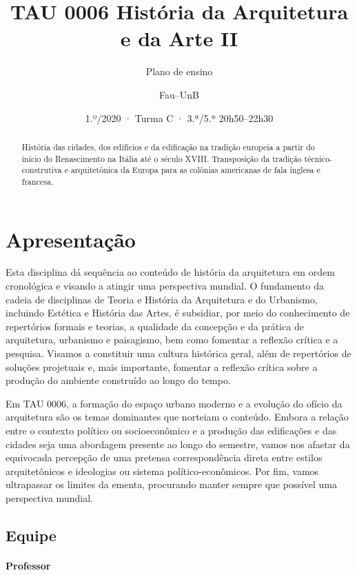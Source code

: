 \documentclass[
  11pt,
  brazil,
  a4paper,
]{article}
\title{TAU 0006 História da Arquitetura e da Arte II}
\subtitle{Plano de ensino}
\author{Fau--UnB}
\date{1.º/2020 · Turma C · 3.ª/5.ª 20h50--22h30}
\begin{document}
\maketitle
\begin{abstract}
História das cidades, dos edifícios e da edificação na tradição europeia
a partir do início do Renascimento na Itália até o século XVIII.
Transposição da tradição técnico-construtiva e arquitetônica da Europa
para as colônias americanas de fala inglesa e francesa.
\end{abstract}

\hypertarget{apresentauxe7uxe3o}{%
\section{Apresentação}\label{apresentauxe7uxe3o}}

Esta disciplina dá sequência ao conteúdo de história da arquitetura em
ordem cronológica e visando a atingir uma perspectiva mundial. O
fundamento da cadeia de disciplinas de Teoria e História da Arquitetura
e do Urbanismo, incluindo Estética e História das Artes, é subsidiar,
por meio do conhecimento de repertórios formais e teorias, a qualidade
da concepção e da prática de arquitetura, urbanismo e paisagismo, bem
como fomentar a reflexão crítica e a pesquisa. Visamos a constituir uma
cultura histórica geral, além de repertórios de soluções projetuais e,
mais importante, fomentar a reflexão crítica sobre a produção do
ambiente construído ao longo do tempo.

Em TAU 0006, a formação do espaço urbano moderno e a evolução do ofício
da arquitetura são os temas dominantes que norteiam o conteúdo. Embora a
relação entre o contexto político ou socioeconômico e a produção das
edificações e das cidades seja uma abordagem presente ao longo do
semestre, vamos nos afastar da equivocada percepção de uma pretensa
correspondência direta entre estilos arquitetônicos e ideologias ou
sistema político-econômicos. Por fim, vamos ultrapassar os limites da
ementa, procurando manter sempre que possível uma perspectiva mundial.

\hypertarget{equipe}{%
\subsection{Equipe}\label{equipe}}

\hypertarget{professor}{%
\paragraph{Professor}\label{professor}}
\end{document}
